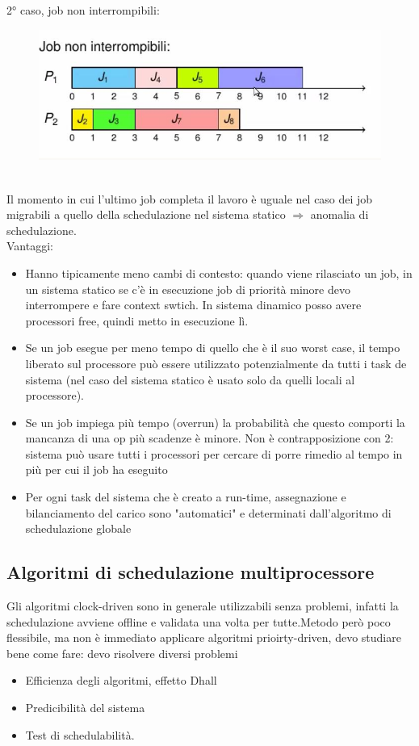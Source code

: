\documentclass[12pt, oneside]{extbook}
\begin{document}
2° caso, job non interrompibili:
\begin{figure}[!h]
\centering
\includegraphics[scale=0.4]{immagini/image-037.jpg}
\end{figure}
\\Il momento in cui l'ultimo job completa il lavoro è uguale nel caso dei job migrabili a quello della schedulazione nel sistema statico $\Rightarrow$ anomalia di schedulazione.\\ Vantaggi:
\begin{itemize}
\item Hanno tipicamente meno cambi di contesto: quando viene rilasciato un job, in un sistema statico se c'è in esecuzione job di priorità minore devo interrompere e fare context swtich. In sistema dinamico posso avere processori free, quindi metto in esecuzione lì.
\item Se un job esegue per meno tempo di quello che è il suo worst case, il tempo liberato sul processore può essere utilizzato potenzialmente da tutti i task de sistema (nel caso del sistema statico è usato solo da quelli locali al processore).
\item Se un job impiega più tempo (overrun) la probabilità che questo comporti la mancanza di una op più scadenze è minore. Non è contrapposizione con 2: sistema può usare tutti i processori per cercare di porre rimedio al tempo in più per cui il job ha eseguito
\item Per ogni task del sistema che è creato a run-time, assegnazione e bilanciamento del carico sono "automatici" e determinati dall'algoritmo di schedulazione globale
\end{itemize}
\subsection{Algoritmi di schedulazione multiprocessore}
Gli algoritmi clock-driven sono in generale utilizzabili senza problemi, infatti la schedulazione avviene offline e validata una volta per tutte.Metodo però poco flessibile, ma non è immediato applicare algoritmi prioirty-driven, devo studiare bene come fare: devo risolvere diversi problemi
\begin{itemize}
\item Efficienza degli algoritmi, effetto Dhall
\item Predicibilità del sistema
\item Test di schedulabilità.
\end{itemize}
\end{document}
